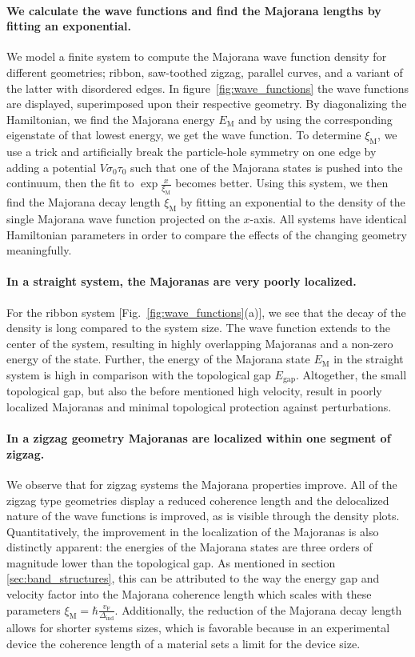 \documentclass[english, twocolumn, 10pt, aps, superscriptaddress, floatfix, prb, citeautoscript]{revtex4-1}
\renewcommand{\comment}[2]{#2}
\renewcommand{\comment}{\paragraph}
\begin{document}
\comment{We calculate the wave functions and find the Majorana lengths by fitting an exponential.}
We model a finite system to compute the Majorana wave function density for different geometries; ribbon, saw-toothed zigzag, parallel curves, and a variant of the latter with disordered edges.
In figure~\ref{fig:wave_functions} the wave functions are displayed, superimposed upon their respective geometry.
By diagonalizing the Hamiltonian, we find the Majorana energy $E_\textrm{M}$ and by using the corresponding eigenstate of that lowest energy, we get the wave function.
To determine $\xi_\textrm{M}$, we use a trick and artificially break the particle-hole symmetry on one edge by adding a potential $V \sigma_0 \tau_0$ such that one of the Majorana states is pushed into the continuum, then the fit to $\exp{\frac{x}{\xi_\textrm{M}}}$ becomes better.
Using this system, we then find the Majorana decay length $\xi_\textrm{M}$ by fitting an exponential to the density of the single Majorana wave function projected on the $x$-axis.
All systems have identical Hamiltonian parameters in order to compare the effects of the changing geometry meaningfully.

\comment{In a straight system, the Majoranas are very poorly localized.}
For the ribbon system [Fig.~\ref{fig:wave_functions}(a)], we see that the decay of the density is long compared to the system size.
The wave function extends to the center of the system, resulting in highly overlapping Majoranas and a non-zero energy of the state.
Further, the energy of the Majorana state $E_\textrm{M}$ in the straight system is high in comparison with the topological gap $E_\textrm{gap}$.
Altogether, the small topological gap, but also the before mentioned high velocity, result in poorly localized Majoranas and minimal topological protection against perturbations.  %

\comment{In a zigzag geometry Majoranas are localized within one segment of zigzag.}
We observe that for zigzag systems the Majorana properties improve.
All of the zigzag type geometries display a reduced coherence length and the delocalized nature of the wave functions is improved, as is visible through the density plots.
Quantitatively, the improvement in the localization of the Majoranas is also distinctly apparent: the energies of the Majorana states are three orders of magnitude lower than the topological gap.
As mentioned in section \ref{sec:band_structures}, this can be attributed to the way the energy gap and velocity factor into the Majorana coherence length which scales with these parameters $\xi_\textrm{M}=\hbar\frac{v_\textrm{F}}{\Delta_\textrm{ind}}$.
Additionally, the reduction of the Majorana decay length allows for shorter systems sizes, which is favorable because in an experimental device the coherence length of a material sets a limit for the device size.
\end{document}
